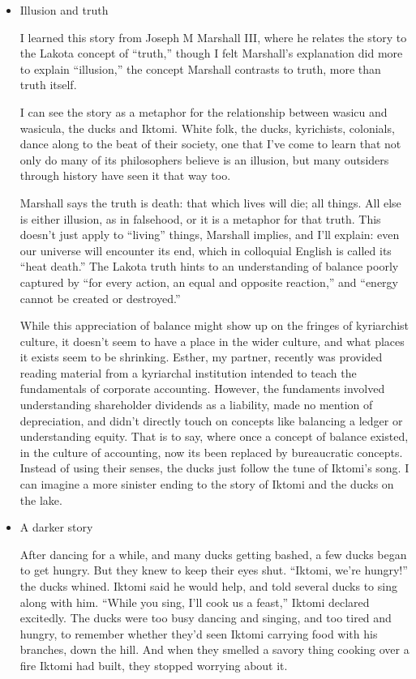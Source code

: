 \documentclass[11pt]{article}
\begin{document}
\begin{itemize}
\begin{itemize}
“Iktomi is killing us!” the duck shouted, and at once the rest took to the sky. But Iktomi didn’t care. He took those he’d killed, roasted them, ate them, and went to sleep.
\item Illusion and truth
\label{sec:orgc952817}

I learned this story from Joseph M Marshall III, where he relates the story to the Lakota concept of “truth,” though I felt Marshall’s explanation did more to explain “illusion,” the concept Marshall contrasts to truth, more than truth itself.

I can see the story as a metaphor for the relationship between wasicu and wasicula, the ducks and Iktomi. White folk, the ducks, kyrichists, colonials, dance along to the beat of their society, one that I’ve come to learn that not only do many of its philosophers believe is an illusion, but many outsiders through history have seen it that way too.

Marshall says the truth is death: that which lives will die; all things. All else is either illusion, as in falsehood, or it is a metaphor for that truth. This doesn’t just apply to “living” things, Marshall implies, and I’ll explain: even our universe will encounter its end, which in colloquial English is called its “heat death.” The Lakota truth hints to an understanding of balance poorly captured by “for every action, an equal and opposite reaction,” and “energy cannot be created or destroyed.”

While this appreciation of balance might show up on the fringes of kyriarchist culture, it doesn’t seem to have a place in the wider culture, and what places it exists seem to be shrinking. Esther, my partner, recently was provided reading material from a kyriarchal institution intended to teach the fundamentals of corporate accounting. However, the fundaments involved understanding shareholder dividends as a liability, made no mention of depreciation, and didn’t directly touch on concepts like balancing a ledger or understanding equity. That is to say, where once a concept of balance existed, in the culture of accounting, now its been replaced by bureaucratic concepts. Instead of using their senses, the ducks just follow the tune of Iktomi’s song. I can imagine a more sinister ending to the story of Iktomi and the ducks on the lake.
\item A darker story
\label{sec:org6899512}

After dancing for a while, and many ducks getting bashed, a few ducks began to get hungry. But they knew to keep their eyes shut. “Iktomi, we’re hungry!” the ducks whined. Iktomi said he would help, and told several ducks to sing along with him. “While you sing, I’ll cook us a feast,” Iktomi declared excitedly. The ducks were too busy dancing and singing, and too tired and hungry, to remember whether they’d seen Iktomi carrying food with his branches, down the hill. And when they smelled a savory thing cooking over a fire Iktomi had built, they stopped worrying about it.


\end{itemize}
\end{itemize}
\end{document}
